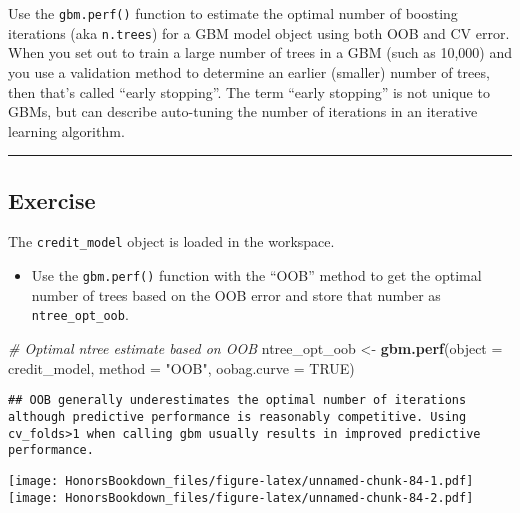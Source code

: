 \documentclass[
]{book}
\newenvironment{Shaded}{\begin{snugshade}}{\end{snugshade}}
\newcommand{\CommentTok}[1]{\textcolor[rgb]{0.56,0.35,0.01}{\textit{#1}}}
\newcommand{\DataTypeTok}[1]{\textcolor[rgb]{0.13,0.29,0.53}{#1}}
\newcommand{\KeywordTok}[1]{\textcolor[rgb]{0.13,0.29,0.53}{\textbf{#1}}}
\newcommand{\NormalTok}[1]{#1}
\newcommand{\OtherTok}[1]{\textcolor[rgb]{0.56,0.35,0.01}{#1}}
\newcommand{\StringTok}[1]{\textcolor[rgb]{0.31,0.60,0.02}{#1}}
\providecommand{\tightlist}{%
  \setlength{\itemsep}{0pt}\setlength{\parskip}{0pt}}
\begin{document}
Use the \texttt{gbm.perf()} function to estimate the optimal number of boosting iterations (aka \texttt{n.trees}) for a GBM model object using both OOB and CV error. When you set out to train a large number of trees in a GBM (such as 10,000) and you use a validation method to determine an earlier (smaller) number of trees, then that's called ``early stopping''. The term ``early stopping'' is not unique to GBMs, but can describe auto-tuning the number of iterations in an iterative learning algorithm.

\begin{center}\rule{0.5\linewidth}{0.5pt}\end{center}

\hypertarget{exercise-25}{%
\subsection*{Exercise}\label{exercise-25}}

The \texttt{credit\_model} object is loaded in the workspace.

\begin{itemize}
\tightlist
\item
  Use the \texttt{gbm.perf()} function with the ``OOB'' method to get the optimal number of trees based on the OOB error and store that number as \texttt{ntree\_opt\_oob}.
\end{itemize}

\begin{Shaded}
\begin{Highlighting}[]
\CommentTok{# Optimal ntree estimate based on OOB}
\NormalTok{ntree_opt_oob <-}\StringTok{ }\KeywordTok{gbm.perf}\NormalTok{(}\DataTypeTok{object =}\NormalTok{ credit_model, }
                          \DataTypeTok{method =} \StringTok{"OOB"}\NormalTok{, }
                          \DataTypeTok{oobag.curve =} \OtherTok{TRUE}\NormalTok{)}
\end{Highlighting}
\end{Shaded}

\begin{verbatim}
## OOB generally underestimates the optimal number of iterations although predictive performance is reasonably competitive. Using cv_folds>1 when calling gbm usually results in improved predictive performance.
\end{verbatim}

\texttt{[image: HonorsBookdown\_files/figure-latex/unnamed-chunk-84-1.pdf]} \texttt{[image: HonorsBookdown\_files/figure-latex/unnamed-chunk-84-2.pdf]}
\end{document}

